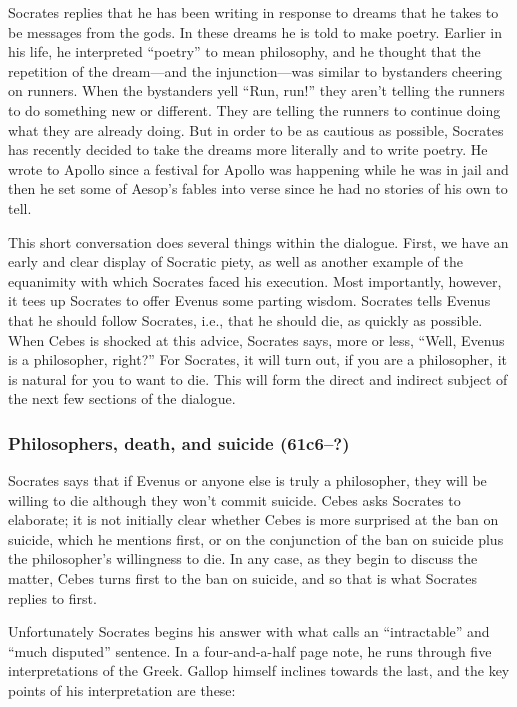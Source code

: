 \documentclass[12pt,letterpaper]{article}
\begin{document}
Socrates replies that he has been writing in response to dreams that he takes to be messages from the gods. In these dreams he is told to make poetry. Earlier in his life, he interpreted ``poetry'' to mean philosophy, and he thought that the repetition of the dream---and the injunction---was similar to bystanders cheering on runners. When the bystanders yell ``Run, run!'' they aren't telling the runners to do something new or different. They are telling the runners to continue doing what they are already doing. But in order to be as cautious as possible, Socrates has recently decided to take the dreams more literally and to write poetry. He wrote to Apollo since a festival for Apollo was happening while he was in jail and then he set some of Aesop's fables into verse since he had no stories of his own to tell.

This short conversation does several things within the dialogue. First, we have an early and clear display of Socratic piety, as well as another example of the equanimity with which Socrates faced his execution. Most importantly, however, it tees up Socrates to offer Evenus some parting wisdom. Socrates tells Evenus that he should follow Socrates, i.e., that he should die, as quickly as possible. When Cebes is shocked at this advice, Socrates says, more or less, ``Well, Evenus is a philosopher, right?'' For Socrates, it will turn out, if you are a philosopher, it is natural for you to want to die. This will form the direct and indirect subject of the next few sections of the dialogue.

\subsubsection{Philosophers, death, and suicide (61c6--?)}

Socrates says that if Evenus or anyone else is truly a philosopher, they will be willing to die although they won't commit suicide. Cebes asks Socrates to elaborate; it is not initially clear whether Cebes is more surprised at the ban on suicide, which he mentions first, or on the conjunction of the ban on suicide plus the philosopher's willingness to die. In any case, as they begin to discuss the matter, Cebes turns first to the ban on suicide, and so that is what Socrates replies to first.

Unfortunately Socrates begins his answer with what \textcite[\textit{ad} 62a2--7]{gallop1975} calls an ``intractable'' and ``much disputed'' sentence. In a four-and-a-half page note, he runs through five interpretations of the Greek. Gallop himself inclines towards the last, and the key points of his interpretation are these:
\end{document}
